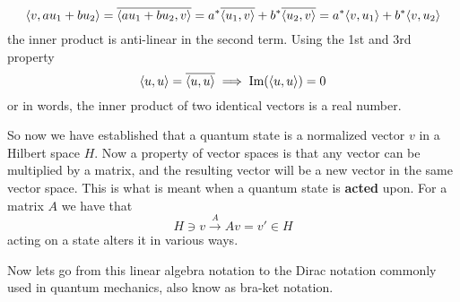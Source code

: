 \begin{equation}
\langle v,au_1 + bu_2 \rangle = \overline{\langle au_1 + bu_2,v \rangle} = a^{*}\overline{\langle u_1,v \rangle} + b^{*}\overline{\langle u_2,v \rangle} =   a^{*}\langle v,u_1 \rangle + b^{*}\langle v,u_2 \rangle
\end{equation} 
the inner product is anti-linear in the second term.
Using the 1st and 3rd property 
\begin{equation}
\langle u,u \rangle = \overline{\langle u,u \rangle} \implies \text{Im}(\langle u,u \rangle) = 0
\end{equation}
or in words, the inner product of two identical vectors is a real number.

So now we have established that a quantum state is a normalized vector $v$ in a Hilbert space $H$. Now a property of vector spaces is that any vector can be multiplied by a matrix, and the resulting vector will be a new vector in the same vector space. This is what is meant when a quantum state is \textbf{acted} upon. For a matrix $A$ we have that 
\begin{equation}
H \ni v  \xrightarrow{A} Av = v' \in H
\end{equation}
acting on a state alters it in various ways.

Now lets go from this linear algebra notation to the Dirac notation commonly used in quantum mechanics, also know as bra-ket notation.

